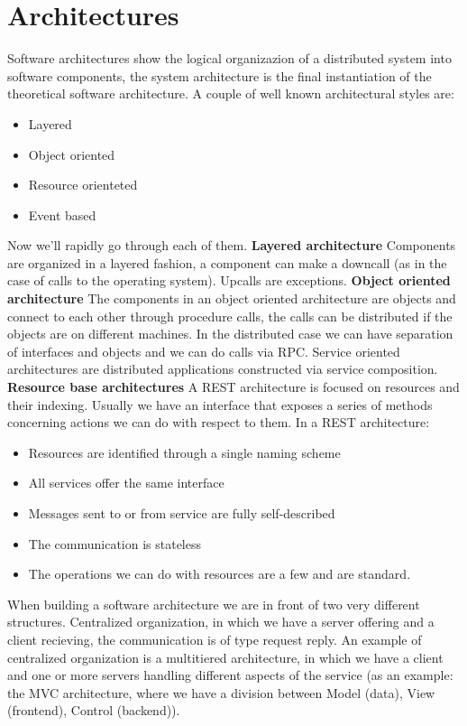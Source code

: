 \section{Architectures}
Software architectures show the logical organizazion of a distributed system into software components, the system architecture is the final instantiation of the theoretical software architecture. \n
A couple of well known architectural styles are:
\begin{itemize}
    \item Layered
    \item Object oriented
    \item Resource orienteted
    \item Event based
\end{itemize}
Now we'll rapidly go through each of them. \n
\textbf{Layered architecture} \n
Components are organized in a layered fashion, a component can make a downcall (as in the case of calls to the operating system). \n
Upcalls are exceptions.
\smallSpace
\textbf{Object oriented architecture} \n
The components in an object oriented architecture are objects and connect to each other through procedure calls, the calls can be distributed if the objects are on different machines. \n
In the distributed case we can have separation of interfaces and objects and we can do calls via RPC. \n
Service oriented architectures are distributed applications constructed via service composition. \n
\smallSpace
\textbf{Resource base architectures} \n
A REST architecture is focused on resources and their indexing. Usually we have an interface that exposes a series of methods concerning actions we can do with respect to them. In a REST architecture:
\begin{itemize}
    \item Resources are identified through a single naming scheme
    \item All services offer the same interface
    \item Messages sent to or from service are fully self-described
    \item The communication is stateless
    \item The operations we can do with resources are a few and are standard.
\end{itemize}
When building a software architecture we are in front of two very different structures. Centralized organization, in which we have a server offering and a client recieving, the communication is of type request reply. \n
An example of centralized organization is a multitiered architecture, in which we have a client and one or more servers handling different aspects of the service (as an example: the MVC architecture, where we have a division between Model (data), View (frontend), Control (backend)). \n
